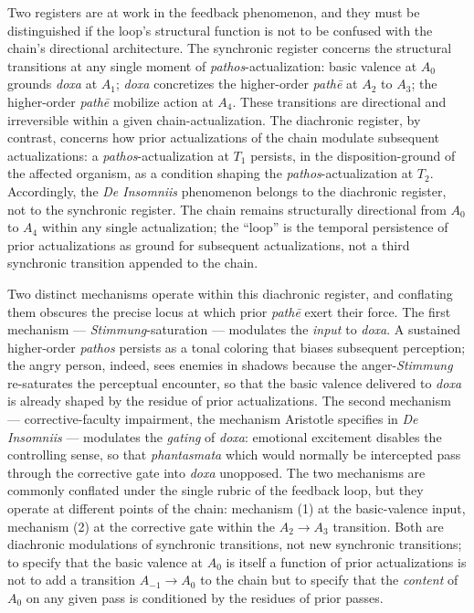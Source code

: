 Two registers are at work in the feedback phenomenon, and they must be distinguished if the loop's structural function is not to be confused with the chain's directional architecture. The synchronic register concerns the structural transitions at any single moment of \textit{pathos}-actualization: basic valence at $A_0$ grounds \textit{doxa} at $A_1$; \textit{doxa} concretizes the higher-order \textit{path\=e} at $A_2$ to $A_3$; the higher-order \textit{path\=e} mobilize action at $A_4$. These transitions are directional and irreversible within a given chain-actualization. The diachronic register, by contrast, concerns how prior actualizations of the chain modulate subsequent actualizations: a \textit{pathos}-actualization at $T_1$ persists, in the disposition-ground of the affected organism, as a condition shaping the \textit{pathos}-actualization at $T_2$. Accordingly, the \textit{De Insomniis} phenomenon belongs to the diachronic register, not to the synchronic register. The chain remains structurally directional from $A_0$ to $A_4$ within any single actualization; the ``loop'' is the temporal persistence of prior actualizations as ground for subsequent actualizations, not a third synchronic transition appended to the chain.

Two distinct mechanisms operate within this diachronic register, and conflating them obscures the precise locus at which prior \textit{path\=e} exert their force. The first mechanism --- \textit{Stimmung}-saturation --- modulates the \textit{input} to \textit{doxa}. A sustained higher-order \textit{pathos} persists as a tonal coloring that biases subsequent perception; the angry person, indeed, sees enemies in shadows because the anger-\textit{Stimmung} re-saturates the perceptual encounter, so that the basic valence delivered to \textit{doxa} is already shaped by the residue of prior actualizations. The second mechanism --- corrective-faculty impairment, the mechanism Aristotle specifies in \textit{De Insomniis} --- modulates the \textit{gating} of \textit{doxa}: emotional excitement disables the controlling sense, so that \textit{phantasmata} which would normally be intercepted pass through the corrective gate into \textit{doxa} unopposed. The two mechanisms are commonly conflated under the single rubric of the feedback loop, but they operate at different points of the chain: mechanism (1) at the basic-valence input, mechanism (2) at the corrective gate within the $A_2 \rightarrow A_3$ transition. Both are diachronic modulations of synchronic transitions, not new synchronic transitions; to specify that the basic valence at $A_0$ is itself a function of prior actualizations is not to add a transition $A_{-1} \rightarrow A_0$ to the chain but to specify that the \textit{content} of $A_0$ on any given pass is conditioned by the residues of prior passes.

